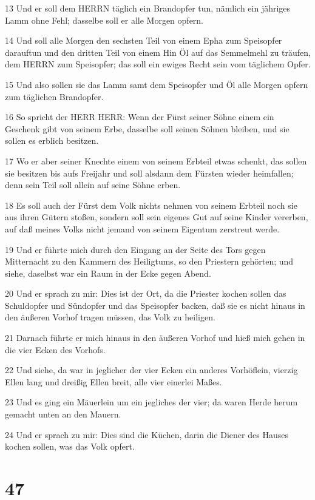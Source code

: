 \par 13 Und er soll dem HERRN täglich ein Brandopfer tun, nämlich ein jähriges Lamm ohne Fehl; dasselbe soll er alle Morgen opfern.
\par 14 Und soll alle Morgen den sechsten Teil von einem Epha zum Speisopfer darauftun und den dritten Teil von einem Hin Öl auf das Semmelmehl zu träufen, dem HERRN zum Speisopfer; das soll ein ewiges Recht sein vom täglichem Opfer.
\par 15 Und also sollen sie das Lamm samt dem Speisopfer und Öl alle Morgen opfern zum täglichen Brandopfer.
\par 16 So spricht der HERR HERR: Wenn der Fürst seiner Söhne einem ein Geschenk gibt von seinem Erbe, dasselbe soll seinen Söhnen bleiben, und sie sollen es erblich besitzen.
\par 17 Wo er aber seiner Knechte einem von seinem Erbteil etwas schenkt, das sollen sie besitzen bis aufs Freijahr und soll alsdann dem Fürsten wieder heimfallen; denn sein Teil soll allein auf seine Söhne erben.
\par 18 Es soll auch der Fürst dem Volk nichts nehmen von seinem Erbteil noch sie aus ihren Gütern stoßen, sondern soll sein eigenes Gut auf seine Kinder vererben, auf daß meines Volks nicht jemand von seinem Eigentum zerstreut werde.
\par 19 Und er führte mich durch den Eingang an der Seite des Tors gegen Mitternacht zu den Kammern des Heiligtums, so den Priestern gehörten; und siehe, daselbst war ein Raum in der Ecke gegen Abend.
\par 20 Und er sprach zu mir: Dies ist der Ort, da die Priester kochen sollen das Schuldopfer und Sündopfer und das Speisopfer backen, daß sie es nicht hinaus in den äußeren Vorhof tragen müssen, das Volk zu heiligen.
\par 21 Darnach führte er mich hinaus in den äußeren Vorhof und hieß mich gehen in die vier Ecken des Vorhofs.
\par 22 Und siehe, da war in jeglicher der vier Ecken ein anderes Vorhöflein, vierzig Ellen lang und dreißig Ellen breit, alle vier einerlei Maßes.
\par 23 Und es ging ein Mäuerlein um ein jegliches der vier; da waren Herde herum gemacht unten an den Mauern.
\par 24 Und er sprach zu mir: Dies sind die Küchen, darin die Diener des Hauses kochen sollen, was das Volk opfert.

\chapter{47}

